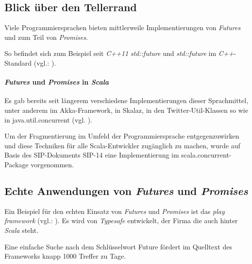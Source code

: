 \subsection{Blick über den Tellerrand}

Viele Programmiersprachen bieten mittlerweile Implementierungen von
\emph{Futures} und zum Teil von \emph{Promises}.

So befindet sich zum Beispiel seit \emph{C++11} \emph{std::future} und
\emph{std::future} im \emph{C++}-Standard (vgl.: \cite{cpp11FAQ}).

\paragraph{\emph{Futures} und \emph{Promises} in \emph{Scala}}

Es gab bereits seit längerem verschiedene Implementierungen dieser Sprachmittel,
unter anderem im Akka-Framework, in Skalaz, in den Twitter-Util-Klassen so wie
in java.util.concurrent (vgl. \cite{futuresTry}).

Um der Fragmentierung im Umfeld der Programmiersprache entgegenzuwirken und
diese Techniken für alle Scala-Entwickler zugänglich zu machen, wurde auf Basis
des SIP-Dokuments SIP-14 eine Implementierung im scala.concurrent-Package
vorgenommen.

\subsection{Echte Anwendungen von \emph{Futures} und \emph{Promises}}

Ein Beispiel für den echten Einsatz von \emph{Futures} und \emph{Promises}
ist das \emph{play framework} (vgl.: \cite{playframework}). Es wird
von \emph{Typesafe} entwickelt, der Firma die auch hinter \emph{Scala}
steht.

Eine einfache Suche nach dem Schlüsselwort \glqq Future\grqq{} fördert
im Quelltext des Frameworks knapp 1000 Treffer zu Tage.
